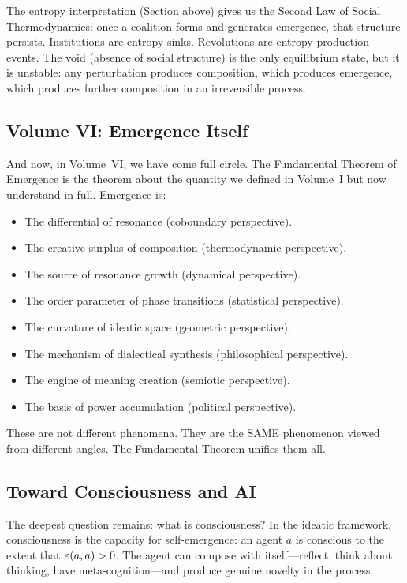 The entropy interpretation (Section above) gives us the Second Law of Social
Thermodynamics: once a coalition forms and generates emergence, that structure
persists. Institutions are entropy sinks. Revolutions are entropy production
events. The void (absence of social structure) is the only equilibrium state,
but it is unstable: any perturbation produces composition, which produces
emergence, which produces further composition in an irreversible process.

\subsection{Volume VI: Emergence Itself}

And now, in Volume~VI, we have come full circle. The Fundamental Theorem of
Emergence is the theorem about the quantity we defined in Volume~I but now
understand in full. Emergence is:
\begin{itemize}
  \item The differential of resonance (coboundary perspective).
  \item The creative surplus of composition (thermodynamic perspective).
  \item The source of resonance growth (dynamical perspective).
  \item The order parameter of phase transitions (statistical perspective).
  \item The curvature of ideatic space (geometric perspective).
  \item The mechanism of dialectical synthesis (philosophical perspective).
  \item The engine of meaning creation (semiotic perspective).
  \item The basis of power accumulation (political perspective).
\end{itemize}

These are not different phenomena. They are the SAME phenomenon viewed from
different angles. The Fundamental Theorem unifies them all.

\subsection{Toward Consciousness and AI}

The deepest question remains: what is consciousness? In the ideatic framework,
consciousness is the capacity for self-emergence: an agent $a$ is conscious to
the extent that $\varepsilon(a,a) > 0$. The agent can compose with itself---reflect,
think about thinking, have meta-cognition---and produce genuine novelty in the
process.

